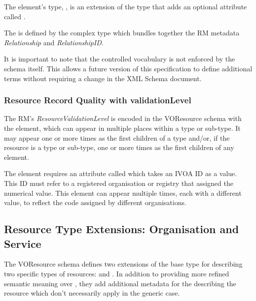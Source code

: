 \documentclass[11pt,a4paper]{ivoa}
\begin{document}
The  element's type,
, is an extension of the
 type that adds an optional attribute called
.  




The  is defined by the
 complex type which bundles together the
RM metadata \emph{Relationship} and
\emph{RelationshipID}.  




It is important to note that the 
controlled vocabulary is not enforced by the schema itself.  This
allows a future version of this specification to define additional
terms without requiring a change in the XML Schema document.


\subsubsection{Resource Record Quality with validationLevel}



The RM's \emph{ResourceValidationLevel} is encoded in the VOResource
schema with the  element, which can appear in
multiple places within a  type or sub-type.  It may
appear one or more times as the first children of a 
type and/or, if the resource is a  type or sub-type,
one or more times as the first children of any 
element.  

The  element requires an attribute called
 which takes an IVOA ID as a value.  This ID
must refer to a registered organisation or registry that assigned the
numerical value.  This element can appear multiple times, each with
a different  value, to reflect the code
assigned by different organisations. 



\subsection{Resource Type Extensions:  Organisation and Service}

The VOResource schema defines two extensions of the base
 type for describing two specific types of
resources:   and .  In
addition to providing more refined semantic meaning over
, they add additional metadata for the
describing the resource which don't necessarily apply in the generic
case. 
\end{document}
